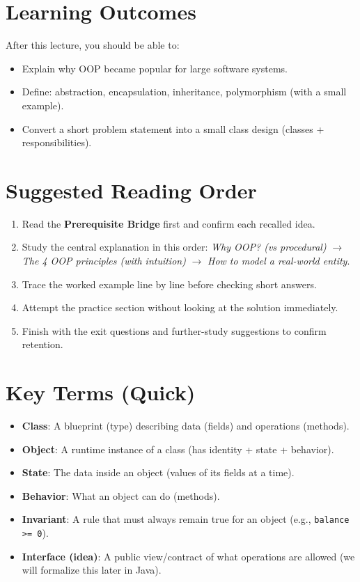 \documentclass[11pt]{article}
\begin{document}
\section{Learning Outcomes}
After this lecture, you should be able to:
\begin{itemize}
  \item Explain why OOP became popular for large software systems.
  \item Define: abstraction, encapsulation, inheritance, polymorphism (with a small example).
  \item Convert a short problem statement into a small class design (classes + responsibilities).
\end{itemize}

\section{Suggested Reading Order}
\begin{enumerate}
  \item Read the \textbf{Prerequisite Bridge} first and confirm each recalled idea.
  \item Study the central explanation in this order: \textit{Why OOP? (vs procedural)} $\rightarrow$ \textit{The 4 OOP principles (with intuition)} $\rightarrow$ \textit{How to model a real-world entity}.
  \item Trace the worked example line by line before checking short answers.
  \item Attempt the practice section without looking at the solution immediately.
  \item Finish with the exit questions and further-study suggestions to confirm retention.
\end{enumerate}
\notesources{\OOPSUnitISources}

\section{Key Terms (Quick)}
\begin{itemize}
  \item \textbf{Class}: A blueprint (type) describing data (fields) and operations (methods).
  \item \textbf{Object}: A runtime instance of a class (has identity + state + behavior).
  \item \textbf{State}: The data inside an object (values of its fields at a time).
  \item \textbf{Behavior}: What an object can do (methods).
  \item \textbf{Invariant}: A rule that must always remain true for an object (e.g., \texttt{balance >= 0}).
  \item \textbf{Interface (idea)}: A public view/contract of what operations are allowed (we will formalize this later in Java).
\end{itemize}
\end{document}
